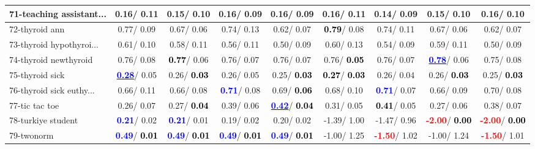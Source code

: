 \begin{table}[h]
\begin{center}
\begin{tabular}{lc|c|c|c|c|c|c|c}
71-teaching assistant... &   0.16/  0.11 &   0.15/  0.10 &   0.16/  0.09 &   0.16/  0.09 &   0.16/  0.11 &   0.14/  0.09 &   0.15/  0.10 &   0.16/  0.10 \\ \hline
72-thyroid ann &   0.77/  0.09 &   0.67/  0.06 &   0.74/  0.13 &   0.62/  0.07 & \textcolor{black}{\textbf{  0.79}}/  0.08 &   0.74/  0.11 &   0.67/  0.06 &   0.62/  0.07 \\
73-thyroid hypothyroi... &   0.61/  0.10 &   0.58/  0.11 &   0.56/  0.11 &   0.50/  0.09 &   0.60/  0.13 &   0.54/  0.09 &   0.59/  0.11 &   0.50/  0.09 \\
74-thyroid newthyroid &   0.76/  0.08 & \textcolor{black}{\textbf{  0.77}}/  0.06 &   0.76/  0.07 &   0.76/  0.07 &   0.76/\textcolor{black}{\textbf{  0.05}} &   0.76/  0.07 & \underline{\textcolor{blue}{\textbf{  0.78}}}/  0.06 &   0.75/  0.08 \\
75-thyroid sick & \underline{\textcolor{blue}{\textbf{  0.28}}}/  0.05 &   0.26/\textcolor{black}{\textbf{  0.03}} &   0.26/  0.05 &   0.25/\textcolor{black}{\textbf{  0.03}} & \textcolor{black}{\textbf{  0.27}}/\textcolor{black}{\textbf{  0.03}} &   0.26/  0.04 &   0.26/\textcolor{black}{\textbf{  0.03}} &   0.25/\textcolor{black}{\textbf{  0.03}} \\
76-thyroid sick euthy... &   0.66/  0.11 &   0.66/  0.08 & \textcolor{blue}{\textbf{  0.71}}/  0.08 &   0.69/\textcolor{black}{\textbf{  0.06}} &   0.68/  0.10 & \textcolor{blue}{\textbf{  0.71}}/  0.07 &   0.66/  0.09 &   0.70/  0.08 \\
77-tic tac toe &   0.26/  0.07 &   0.27/\textcolor{black}{\textbf{  0.04}} &   0.39/  0.06 & \underline{\textcolor{blue}{\textbf{  0.42}}}/\textcolor{black}{\textbf{  0.04}} &   0.31/  0.05 & \textcolor{black}{\textbf{  0.41}}/  0.05 &   0.27/  0.06 &   0.38/  0.07 \\
78-turkiye student & \textcolor{blue}{\textbf{  0.21}}/  0.02 & \textcolor{blue}{\textbf{  0.21}}/  0.01 &   0.19/  0.02 &   0.20/  0.02 &  -1.39/  1.00 &  -1.47/  0.96 & \textcolor{red}{\textbf{ -2.00}}/\textcolor{black}{\textbf{  0.00}} & \textcolor{red}{\textbf{ -2.00}}/\textcolor{black}{\textbf{  0.00}} \\ \hline
79-twonorm & \textcolor{blue}{\textbf{  0.49}}/\textcolor{black}{\textbf{  0.01}} & \textcolor{blue}{\textbf{  0.49}}/\textcolor{black}{\textbf{  0.01}} & \textcolor{blue}{\textbf{  0.49}}/\textcolor{black}{\textbf{  0.01}} & \textcolor{blue}{\textbf{  0.49}}/\textcolor{black}{\textbf{  0.01}} &  -1.00/  1.25 & \textcolor{red}{\textbf{ -1.50}}/  1.02 &  -1.00/  1.24 & \textcolor{red}{\textbf{ -1.50}}/  1.01 \\

\end{tabular}
\end{center}
\end{table}
